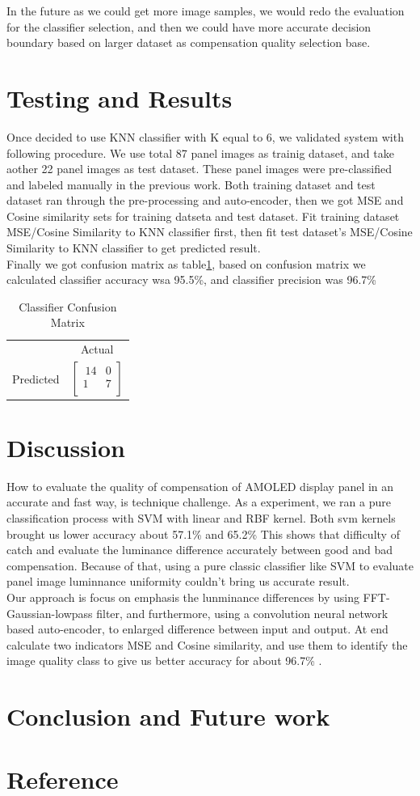 \documentclass[runningheads]{llncs}
\begin{document}
In the future as we could get more image samples, we would redo the evaluation for the classifier selection, and then we could have more accurate decision boundary based on larger dataset as compensation quality selection base.

\section{Testing and Results}
Once decided to use KNN classifier with K equal to 6,  we validated system with following procedure. 
We use total 87 panel images as trainig dataset, and take aother 22 panel images as test dataset. These panel images were pre-classified and labeled manually in the previous work. Both training dataset and test dataset ran through the pre-processing and auto-encoder, then we got MSE and Cosine similarity sets for training datseta and test dataset. Fit training dataset MSE/Cosine Similarity to KNN classifier first, then fit test dataset's MSE/Cosine Similarity to KNN classifier to get predicted result. \\
Finally we got confusion matrix as table\ref{tab:cm}, based on confusion matrix we calculated classifier accuracy wsa 95.5\%, and classifier precision was 96.7\%\\
\begin{table}
    \centering
    \caption{Classifier Confusion Matrix}
    \label{tab:cm}
\begin{tabular}{cc}
    & Actual \\
    Predicted & $\begin{bmatrix}\ 
        14 & 0 \\
        1 & 7\\
        \end{bmatrix}$\\
\end{tabular}
\end{table}
\section{Discussion}
How to evaluate the quality of compensation of AMOLED display panel in an accurate and fast way, is technique challenge. As a experiment, we ran a pure classification process with SVM with linear and RBF kernel.  
Both svm kernels brought us lower accuracy about 57.1\% and 65.2\%
This shows that difficulty of catch and evaluate the luminance difference accurately between good and bad compensation. Because of that, using a pure classic classifier like SVM to evaluate panel image luminnance uniformity couldn't bring us accurate result.\\
Our approach is focus on emphasis the lunminance differences by using FFT-Gaussian-lowpass filter, and furthermore, using a convolution neural network based auto-encoder, to enlarged difference between input and output.
At end calculate two indicators MSE and Cosine similarity, and use them to identify the image quality class to give us better accuracy for about 96.7\% .
\section{Conclusion and Future work}


\section{Reference}
\end{document}
